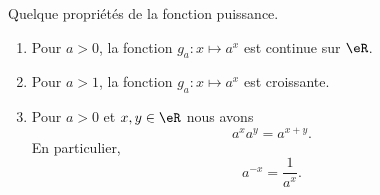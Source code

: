 \begin{proposition}      \label{PROPooVADRooLCLOzP}
    Quelque propriétés de la fonction puissance. 
    \begin{enumerate}
        \item       \label{ITEMooQHYRooJIewyp}
            Pour \( a>0\), la fonction \( g_a\colon x\mapsto a^x\) est continue sur \( \eR\).
        \item       \label{ITEMooIZBLooSGtWIp}
            Pour \( a>1\), la fonction \( g_a\colon x\mapsto a^x\) est croissante.
        \item       \label{ITEMooSCJBooNVJZah}
            Pour \( a>0\) et \( x,y\in \eR\) nous avons
            \begin{equation}        \label{EQooEWIHooDRAQGR}
                a^xa^y=a^{x+y}.
            \end{equation}
            En particulier, 
            \begin{equation}
                a^{-x}=\frac{1}{ a^x }.
            \end{equation}
    \end{enumerate}
\end{proposition}

